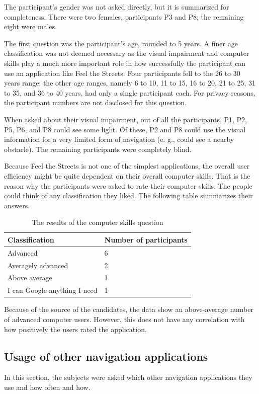 \documentclass[nolof,digital]{fithesis3}
\begin{document}
The participant's gender was not asked directly, but it is summarized for completeness. There were two females, participants P3 and P8; the remaining eight were males.

The first question was the participant's age, rounded to 5 years. A finer age classification was not deemed necessary as the visual impairment and computer skills play a much more important role in how successfully the participant can use an application like Feel the Streets. Four participants fell to the 26 to 30 years range; the other age ranges, namely 6 to 10, 11 to 15, 16 to 20, 21 to 25, 31 to 35, and 36 to 40 years, had only a single participant each. For privacy reasons, the participant numbers are not disclosed for this question.

When asked about their visual impairment, out of all the participants, P1, P2, P5, P6, and P8 could see some light. Of these, P2 and P8 could use the visual information for a very limited form of navigation (e. g., could see a nearby obstacle). The remaining participants were completely blind.

Because Feel the Streets is not one of the simplest applications, the overall user efficiency might be quite dependent on their overall computer skills. That is the reason why the participants were asked to rate their computer skills. The people could think of any classification they liked. The following table summarizes their answers.
\vspace*{0.5 cm}
\begin{table}
\caption{The results of the computer skills question}
\begin{tabularx}{\textwidth}{ |X|X| }
\hline
Classification & Number of participants \\
\hline
Advanced & 6 \\
Averagely advanced & 2 \\
Above average & 1 \\
I can Google anything I need & 1 \\
\hline
\end{tabularx}
\end{table}

Because of the source of the candidates, the data show an above-average number of advanced computer users. However, this does not have any correlation with how positively the users rated the application.
\subsection{Usage of other navigation applications}
In this section, the subjects were asked which other navigation applications they use and how often and how.
\end{document}
